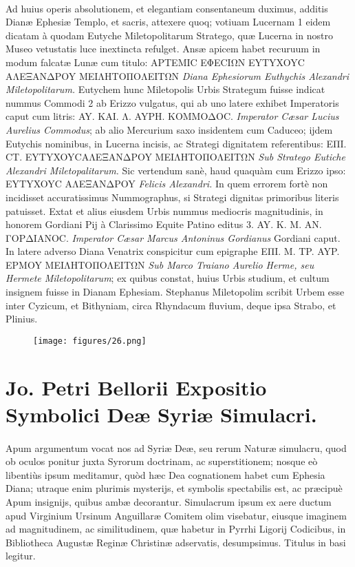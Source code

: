 \documentclass[a4paper, 11pt, oneside, polutonikogreek, latin]{article}
\begin{document}
\paragraph{}
Ad huius operis absolutionem, et elegantiam consentaneum duximus, additis Dianæ Ephesiæ Templo, et sacris, attexere quoq; votiuam Lucernam 1 eidem dicatam à quodam Eutyche Miletopolitarum Stratego, quæ Lucerna in nostro Museo vetustatis luce inextincta refulget. Ansæ apicem habet recuruum in modum falcatæ Lunæ cum titulo: APTEMIC EΦECIΩN EYTYXOYC AΛEΞANΔPOY MEIΛHTOΠOΛEITΩN \emph{Diana Ephesiorum Euthychis Alexandri Miletopolitarum.} Eutychem hunc Miletopolis Urbis Strategum fuisse indicat nummus Commodi 2 ab Erizzo vulgatus, qui ab uno latere exhibet Imperatoris caput cum litris: AY. KAI. Λ. AYPH. KOMMOΔOC. \emph{Imperator Cæsar Lucius Aurelius Commodus}; ab alio Mercurium saxo insidentem cum Caduceo; ijdem Eutychis nominibus, in Lucerna incisis, ac Strategi dignitatem referentibus: EΠI. CT. EYTYXOYCAΛEΞANΔPOY MEIΛHTOΠOΛEITΩN \emph{Sub Stratego Eutiche Alexandri Miletopalitarum.} Sic vertendum sanè, haud quaquàm cum Erizzo ipso: EYTYXOYC AΛEΞANΔPOY \emph{Felicis Alexandri.} In quem errorem fortè non incidisset accuratissimus Nummographus, si Strategi dignitas primoribus literis patuisset. Extat et alius eiusdem Urbis nummus mediocris magnitudinis, in honorem Gordiani Pij à Clarissimo Equite Patino editus 3. AY. K. M. AN. ΓOPΔIANOC. \emph{Imperator Cæsar Marcus Antoninus Gordianus} Gordiani caput. In latere adverso Diana Venatrix conspicitur cum epigraphe EΠI. M. TP. AYP. EPMOY MEIΛHTOΠOΛEITΩN \emph{Sub Marco Traiano Aurelio Herme, seu Hermete Miletopolitarum}; ex quibus constat, huius Urbis studium, et cultum insignem fuisse in Dianam Ephesiam. Stephanus Miletopolim scribit Urbem esse inter Cyzicum, et Bithyniam, circa Rhyndacum fluvium, deque ipsa Strabo, et Plinius.
\clearpage
\vspace*{\fill}
\begin{figure}[H]
\centering
\texttt{[image: figures/26.png]}
\end{figure}
\vspace*{\fill}
\clearpage
\section{Jo. Petri Bellorii Expositio Symbolici Deæ Syriæ Simulacri.}
\paragraph{}
Apum argumentum vocat nos ad Syriæ Deæ, seu rerum Naturæ simulacru, quod ob oculos ponitur juxta Syrorum doctrinam, ac superstitionem; nosque eò libentiùs ipsum meditamur, quòd hæc Dea cognationem habet cum Ephesia Diana; utraque enim plurimis mysterijs, et symbolis spectabilis est, ac præcipuè Apum insignijs, quibus ambæ decorantur. Simulacrum ipsum ex aere ductum apud Virginium Ursinum Anguillaræ Comitem olim visebatur, eiusque imaginem ad magnitudinem, ac similitudinem, quæ habetur in Pyrrhi Ligorij Codicibus, in Bibliotheca Augustæ Reginæ Christinæ adservatis, desumpsimus. Titulus in basi legitur.
\end{document}
